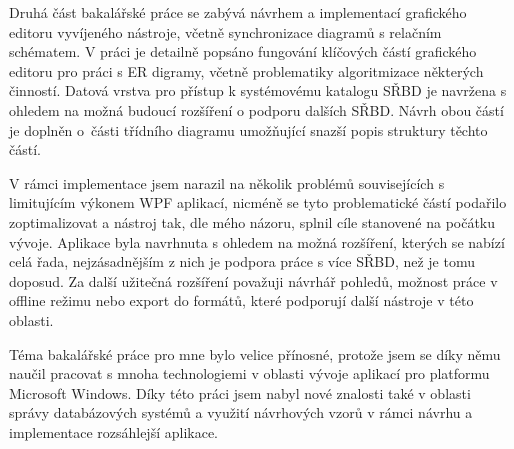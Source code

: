 \documentclass[czech,bachelor,public,dept460,male,oneside]{diploma}
\begin{document}
Druhá část bakalářské práce se zabývá návrhem a implementací grafického editoru vyvíjeného nástroje, včetně synchronizace diagramů s relačním schématem. V práci je detailně popsáno fungování klíčových částí grafického editoru pro práci s ER digramy, včetně problematiky algoritmizace některých činností. Datová vrstva pro přístup k systémovému katalogu SŘBD je navržena s ohledem na možná budoucí rozšíření o podporu dalších SŘBD. Návrh obou částí je doplněn o~části třídního diagramu umožňující snazší popis struktury těchto částí.

V rámci implementace jsem narazil na několik problémů souvisejících s limitujícím výkonem WPF aplikací, nicméně se tyto problematické částí podařilo zoptimalizovat a nástroj tak, dle mého názoru, splnil cíle stanovené na počátku vývoje. Aplikace byla navrhnuta s ohledem na možná rozšíření, kterých se nabízí celá řada, nejzásadnějším z nich je podpora práce s více SŘBD, než je tomu doposud. Za další užitečná rozšíření považuji návrhář pohledů, možnost práce v offline režimu nebo export do formátů, které podporují další nástroje v této oblasti.

Téma bakalářské práce pro mne bylo velice přínosné, protože jsem se díky němu naučil pracovat s mnoha technologiemi v oblasti vývoje aplikací pro platformu Microsoft Windows. Díky této práci jsem nabyl nové znalosti také v oblasti správy databázových systémů a využití návrhových vzorů v rámci návrhu a implementace rozsáhlejší aplikace.
\end{document}
